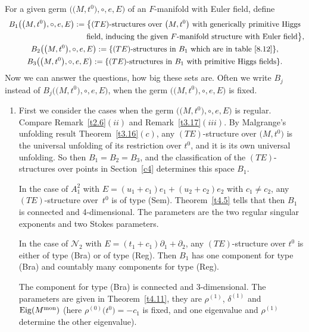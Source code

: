 \documentclass[10pt,a4paper]{amsart}
\numberwithin{equation}{section}
\numberwithin{figure}{section}
\newcommand{\NN}{{\mathcal N}}
\newcommand{\paa}{\partial}
\DeclareMathOperator{\Eig}{Eig}
\begin{document}
\begin{Remarks}%
For a given germ $\big(\big(M,t^0\big),\circ,e,E\big)$ of an $F$-manifold
with Euler field, define
\begin{gather*}
B_1\big(\big(M,t^0\big),\circ,e,E\big):=
\big\{(TE)\text{-structures over }\big(M,t^0\big)
\text{ with generically primitive Higgs}
\\ \hphantom{B_1(\big(M,t^0\big),\circ,e,E):=\big\{}
\text{field, inducing the given $F$-manifold structure with Euler field}\big\},
\\
B_2\big(\big(M,t^0\big),\circ,e,E\big):=\{(TE)\text{-structures in }B_1
\text{ which are in table~\eqref{8.12}}\},
\\
B_3\big(\big(M,t^0\big),\circ,e,E\big):=
\{(TE)\text{-structures in }B_1\text{ with primitive Higgs fields}\}.
\end{gather*}
Now we can answer the questions, how big these sets are.
Often we write $B_j$ instead of $B_j\big(\big(M,t^0\big),\circ,e,E\big)$,
when the germ $\big(\big(M,t^0\big),\circ,e,E\big)$ is fixed.

\begin{enumerate}\itemsep=0pt
\item[$(i)$] First we consider the cases when
the germ $\big(\big(M,t^0\big),\circ, e,E\big)$ is regular.
Compare Remark~\ref{t2.6}$(ii)$ and Remark~\ref{t3.17}$(iii)$.
By Malgrange's unfolding result Theorem~\ref{t3.16}$(c)$,
any $(TE)$-structure over $\big(M,t^0\big)$ is the universal
unfolding of its restriction over $t^0$,
and it is its own universal unfolding.
So then $B_1=B_2=B_3$, and the classification of
the $(TE)$-structures over points in Section~\ref{c4}
determines this space $B_1$.

In the case of $A_1^2$ with $E=(u_1+c_1)e_1+(u_2+c_2)e_2$
with $c_1\neq c_2$, any $(TE)$-structure over~$t^0$
is of type (Sem). Theorem~\ref{t4.5}
tells that then $B_1$ is connected and 4-dimensional.
The parameters are the two regular singular exponents
and two Stokes parameters.

In the case of $\NN_2$ with $E=(t_1+c_1)\paa_1+\paa_2$,
any $(TE)$-structure over $t^0$ is either of type (Bra)
or of type (Reg). Then $B_1$ has one component
for type (Bra) and countably many components for type (Reg).

The component for type (Bra) is connected and 3-dimensional.
The parameters are given in Theorem~\ref{t4.11},
they are $\rho^{(1)}$, $\delta^{(1)}$ and
$\Eig(M^{\rm mon})$ \big(here $\rho^{(0)}\big(t^0\big)=-c_1$ is fixed, and
one eigenvalue and $\rho^{(1)}$ determine the other eigenvalue\big).


\end{enumerate}
\end{Remarks}
\end{document}
